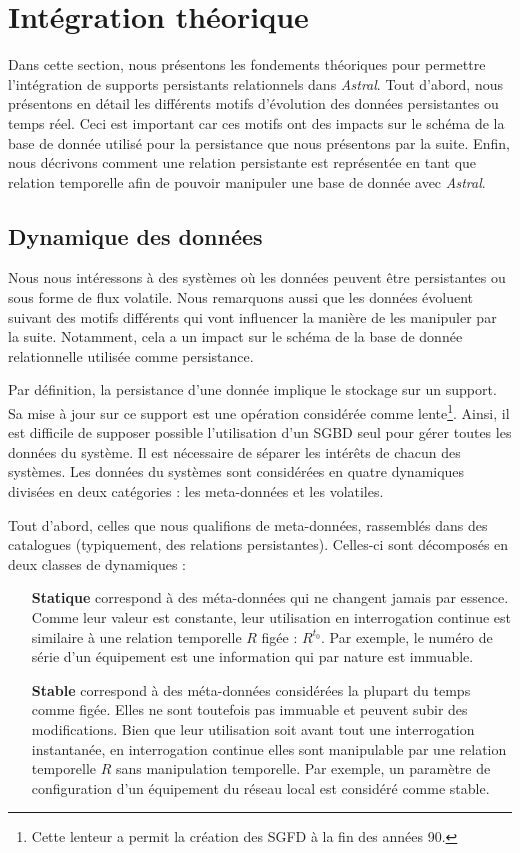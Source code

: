 \section{Intégration théorique}\label{sec:contrib:asteroid:theorie}
Dans cette section, nous présentons les fondements théoriques pour permettre l'intégration de supports persistants relationnels dans \textit{Astral}. Tout d'abord, nous présentons en détail les différents motifs d'évolution des données persistantes ou temps réel. Ceci est important car ces motifs ont des impacts sur le schéma de la base de donnée utilisé pour la persistance que nous présentons par la suite. Enfin, nous décrivons comment une relation persistante est représentée en tant que relation temporelle afin de pouvoir manipuler une base de donnée avec \textit{Astral}.

\subsection{Dynamique des données}
Nous nous intéressons à des systèmes où les données peuvent être persistantes ou sous forme de flux volatile. Nous remarquons aussi que les données évoluent suivant des motifs différents qui vont influencer la manière de les manipuler par la suite. Notamment, cela a un impact sur le schéma de la base de donnée relationnelle utilisée comme persistance.

Par définition, la persistance d'une donnée implique le stockage sur un support. Sa mise à jour sur ce support est une opération considérée comme lente\footnote{Cette lenteur a permit la création des SGFD à la fin des années 90.}. Ainsi, il est difficile de supposer possible l'utilisation d'un SGBD seul pour gérer toutes les données du système. Il est nécessaire de séparer les intérêts de chacun des systèmes. Les données du systèmes sont considérées en quatre dynamiques divisées en deux catégories : les meta-données et les volatiles. 

Tout d'abord, celles que nous qualifions de meta-données, rassemblés dans des catalogues (typiquement, des relations persistantes). Celles-ci sont décomposés en deux classes de dynamiques :
\begin{itemize}
	\item[\textbf{Statique}] correspond à des méta-données qui ne changent jamais par essence. Comme leur valeur est constante, leur utilisation en interrogation continue est similaire à une relation temporelle $R$ figée : $R^{t_0}$. Par exemple, le numéro de série d'un équipement est une information qui par nature est immuable.
	\item[\textbf{Stable}] correspond à des méta-données considérées la plupart du temps comme figée. Elles ne sont toutefois pas immuable et peuvent subir des modifications. Bien que leur utilisation soit avant tout une interrogation instantanée, en interrogation continue elles sont manipulable par une relation temporelle $R$ sans manipulation temporelle. Par exemple, un paramètre de configuration d'un équipement du réseau local est considéré comme stable.
\end{itemize}

